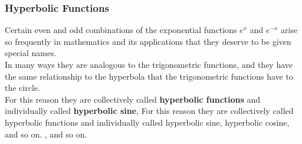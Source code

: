 \begin{frame}
\frametitle{Hyperbolic Functions}
Certain even and odd combinations of the exponential functions $ e^x $ and $ e^{-x} $  arise so frequently in mathematics and its applications that they deserve to be given special names.\\
In many ways they are analogous to the trigonometric functions, and they have the same relationship to the hyperbola that the trigonometric functions have to the circle.\\
For this reason they are collectively called \textbf{hyperbolic functions} and individually called \textbf{hyperbolic sine}, For this reason they are collectively called hyperbolic functions and individually called hyperbolic sine, hyperbolic cosine, and so on.
, and so on.
\end{frame}
